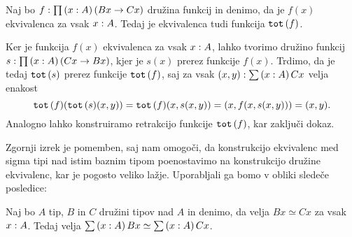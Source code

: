 \begin{izrek}
  Naj bo \(f : \prod \left( x : A \right) \left(Bx \to Cx\right)\) družina funkcij
  in denimo, da je \(f(x)\) ekvivalenca za vsak \(x : A\). Tedaj je
  ekvivalenca tudi funkcija \(\textnormal{\texttt{tot}}\,(f)\).
\end{izrek}

\begin{dokaz}
  Ker je funkcija \(f(x)\) ekvivalenca za vsak \(x : A\),
  lahko tvorimo družino funkcij
  \(s : \prod \left( x : A \right) \left(Cx \to Bx\right)\), kjer je \(s(x)\)
  prerez funkcije \(f(x)\).
  Trdimo, da je tedaj \(\textnormal{\texttt{tot}}\,(s)\) prerez funkcije \(\textnormal{\texttt{tot}}\,(f)\), saj
  za vsak \((x, y) : \sum \left( x : A \right) Cx\) velja enakost
  \[\textnormal{\texttt{tot}}\,(f)(\textnormal{\texttt{tot}}\,(s)(x, y)) = \textnormal{\texttt{tot}}\,(f)(x, s(x, y)) = (x, f(x, s(x, y))) = (x, y).\]
  Analogno lahko konstruiramo retrakcijo funkcije \(\textnormal{\texttt{tot}}\,(f)\), kar zaključi dokaz.
\end{dokaz}

Zgornji izrek je pomemben, saj nam omogoči, da konstrukcijo ekvivalenc med sigma tipi
nad istim baznim tipom poenostavimo na konstrukcijo družine ekvivalenc, kar je pogosto
veliko lažje. Uporabljali ga bomo v obliki sledeče posledice:

\begin{posledica}
  \label{equiv-tot}
  Naj bo \(A\) tip, \(B\) in \(C\) družini tipov nad \(A\) in denimo, da velja
  \(Bx \simeq Cx\) za vsak \(x : A\).
  Tedaj velja \(\sum \left( x : A \right) Bx \simeq \sum \left( x : A \right) Cx\).
\end{posledica}

